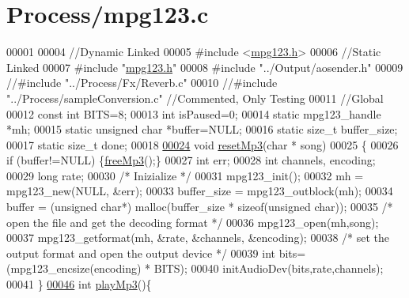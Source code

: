 \hypertarget{mpg123_8c_source}{\section{\-Process/mpg123.c}
}

\begin{DoxyCode}
00001 
00004 \textcolor{comment}{//Dynamic Linked}
00005 \textcolor{preprocessor}{#include <\hyperlink{mpg123_8h}{mpg123.h}>}
00006 \textcolor{comment}{//Static Linked}
00007 \textcolor{preprocessor}{#include "\hyperlink{mpg123_8h}{mpg123.h}"}
00008 \textcolor{preprocessor}{#include "../Output/aosender.h"}
00009 \textcolor{comment}{//#include "../Process/Fx/Reverb.c"}
00010 \textcolor{comment}{//#include "../Process/sampleConversion.c" //Commented, Only Testing}
00011 \textcolor{comment}{//Global}
00012 \textcolor{keyword}{const} \textcolor{keywordtype}{int}       BITS=8;
00013 \textcolor{keywordtype}{int}         isPaused=0;
00014 \textcolor{keyword}{static} mpg123\_handle    *mh;
00015 \textcolor{keyword}{static} \textcolor{keywordtype}{unsigned} \textcolor{keywordtype}{char}    *buffer=NULL;
00016 \textcolor{keyword}{static} \textcolor{keywordtype}{size\_t}       buffer\_size;
00017 \textcolor{keyword}{static} \textcolor{keywordtype}{size\_t}       done;
00018 
\hypertarget{mpg123_8c_source_l00024}{}\hyperlink{mpg123_8h_a644a4493a8aeafe0544786ffb8b2a96a}{00024} \textcolor{keywordtype}{void} \hyperlink{mpg123_8c_a644a4493a8aeafe0544786ffb8b2a96a}{resetMp3}(\textcolor{keywordtype}{char} * song)
00025 \{
00026     \textcolor{keywordflow}{if} (buffer!=NULL) \{\hyperlink{mpg123_8c_ad8bff7d817bc1b5f8c1ab8388158bc29}{freeMp3}();\}
00027     \textcolor{keywordtype}{int} err;
00028     \textcolor{keywordtype}{int} channels, encoding;
00029     \textcolor{keywordtype}{long} rate;
00030     \textcolor{comment}{/* Inizialize */}
00031     mpg123\_init();
00032     mh = mpg123\_new(NULL, &err);
00033     buffer\_size = mpg123\_outblock(mh);
00034     buffer = (\textcolor{keywordtype}{unsigned} \textcolor{keywordtype}{char}*) malloc(buffer\_size * \textcolor{keyword}{sizeof}(\textcolor{keywordtype}{unsigned} \textcolor{keywordtype}{char}));
00035     \textcolor{comment}{/* open the file and get the decoding format */}
00036     mpg123\_open(mh,song);
00037     mpg123\_getformat(mh, &rate, &channels, &encoding);
00038     \textcolor{comment}{/* set the output format and open the output device */}
00039     \textcolor{keywordtype}{int} bits=(mpg123\_encsize(encoding) * BITS);
00040     initAudioDev(bits,rate,channels);
00041 \}
\hypertarget{mpg123_8c_source_l00046}{}\hyperlink{mpg123_8h_a548762aaed08753cbed2cfabe0a5202b}{00046} \textcolor{keywordtype}{int} \hyperlink{mpg123_8c_a548762aaed08753cbed2cfabe0a5202b}{playMp3}()\{

\end{DoxyCode}
